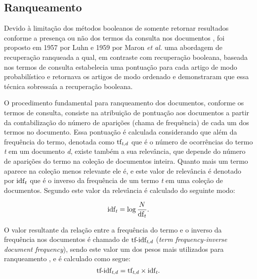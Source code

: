 \subsection{Ranqueamento} \label{subsec:Ranqueamento}
Devido à limitação dos métodos booleanos de somente retornar resultados conforme a presença ou não dos termos da consulta nos documentos \cite[p.~100]{Manning2008IIR}, foi proposto em 1957 por Luhn e 1959 por Maron \textit{et al.} uma abordagem de recuperação ranqueada \cite[p.~1446]{Sanderson2012THIRR} a qual, em contraste com recuperação booleana, baseada nos termos de consulta estabelecia uma pontuação para cada artigo de modo probabilístico e retornava os artigos de modo ordenado e demonstraram que essa técnica sobressaía a recuperação booleana.

O procedimento fundamental para ranqueamento dos documentos, conforme os termos de consulta, consiste na atribuição de pontuação aos documentos a partir da contabilização do número de aparições (chama de frequência) de cada um dos termos no documento.
Essa pontuação é calculada considerando que além da frequência do termo, denotada como $\text{tf}_{\text{\textit{t},\textit{d}}}$ que é o número de ocorrências do termo \textit{t} em um documento \textit{d}, existe também a sua relevância, que depende do número de aparições do termo na coleção de documentos inteira.
Quanto mais um termo aparece na coleção menos relevante ele é, e este valor de relevância é denotado por $\text{idf}_{\text{\textit{t}}}$ que é o inverso da frequência de um termo \textit{t} em uma coleção de documentos.
Segundo  este valor da relevância é calculado do seguinte modo:

\begin{equation}
    \text{idf}_{\text{\textit{t}}} = \log{\frac{N}{\text{df}_{\text{\textit{t}}}}}.
\end{equation}

O valor resultante da relação entre a frequência do termo e o inverso da frequência nos documentos é chamado de $\text{tf-idf}_{\text{\textit{t},\textit{d}}}$ (\textit{term frequency-inverse document frequency}), sendo este valor um dos pesos mais utilizados para ranqueamento \cite[p.~107--110]{Manning2008IIR}, e é calculado  como segue:
\begin{equation}
    \text{tf-idf}_{\text{\textit{t},\textit{d}}}  = \text{tf}_{\text{\textit{t},\textit{d}}} \times \text{idf}_{\text{\textit{t}}}.
\end{equation}

